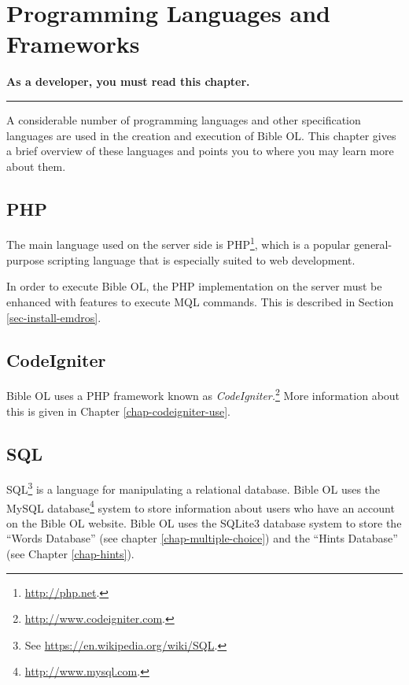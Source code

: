 \documentclass[11pt,oneside,a4paper]{memoir}
\begin{document}
\chapter{Programming Languages and Frameworks}\label{chap-proglang}

\textbf{As a developer, you must read this chapter.}
\plainbreak{3}

A considerable number of programming languages and other specification languages are used in the
creation and execution of Bible OL. This chapter gives a brief overview of these languages and
points you to where you may learn more about them.


\section{PHP}

The main language used on the server side is PHP\footnote{\url{http://php.net}.}, which is a popular
general-purpose scripting language that is especially suited to web development.

In order to execute Bible OL, the PHP implementation on the server must be enhanced with features to
execute MQL commands. This is described in Section \ref{sec-install-emdros}.

\section{CodeIgniter}\label{sec-codeigniter}

Bible OL uses a PHP framework known as \emph{CodeIgniter.}\footnote{\url{http://www.codeigniter.com}.}
More information about this is given in Chapter \ref{chap-codeigniter-use}.


\section{SQL}

SQL\footnote{See \url{https://en.wikipedia.org/wiki/SQL}.} is a language for manipulating a
relational database. Bible OL uses the MySQL database\footnote{\url{http://www.mysql.com}.} system to store
information about users who have an account on the Bible OL website. Bible OL uses the SQLite3
database system to store the ``Words Database'' (see chapter \ref{chap-multiple-choice}) and the
``Hints Database'' (see Chapter \ref{chap-hints}).
\end{document}
